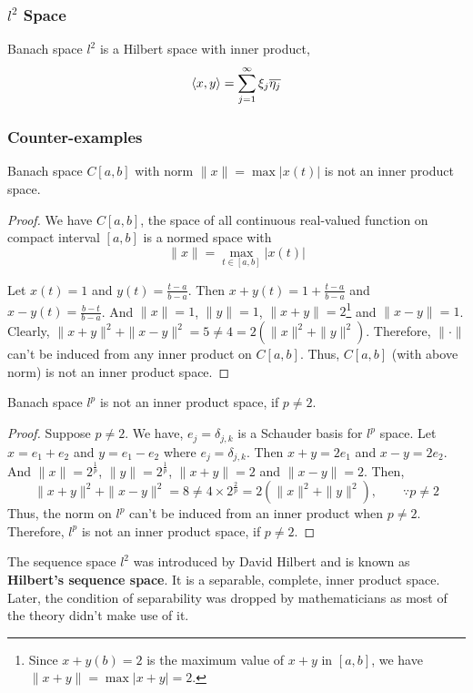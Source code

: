 \subsubsection{$l^2$ Space}
	Banach space $l^2$ is a Hilbert space with inner product,
	\[ \left\langle x,y \right\rangle = \sum_{j=1}^\infty \xi_j \overline{\eta_j} \]
\subsubsection{Counter-examples}
\begin{remark}
	Banach space $C[a,b]$ with norm $\|x\| = \max |x(t)|$ is not an inner product space.
\end{remark}
\begin{proof}
	We have $C[a,b]$, the space of all continuous real-valued function on compact interval $[a,b]$ is a normed space with \[ \|x\| = \max_{t \in [a,b]} |x(t)| \]

	Let $x(t) = 1$ and $y(t) = \frac{t-a}{b-a}$.
	Then $x+y(t) = 1+\frac{t-a}{b-a}$ and $x-y(t) = \frac{b-t}{b-a}$.
	And $\|x\| = 1$, $\|y\| =1$, $\|x+y\| = 2$\dag\footnote{Since $x+y(b) = 2$ is the maximum value of $x+y$ in $[a,b]$, we have $\|x+y\| = \max |x+y| = 2$.} and $\|x-y\| = 1$.
	Clearly, $\|x+y\|^2 + \|x-y\|^2 = 5 \ne 4 = 2(\|x\|^2+\|y\|^2)$.
	Therefore, $\| \cdot \|$ can't be induced from any inner product on $C[a,b]$.
	Thus, $C[a,b]$ (with above norm) is not an inner product space.
\end{proof}

\begin{remark}
	Banach space $l^p$ is not an inner product space, if $p \ne 2$.
\end{remark}
\begin{proof}
	Suppose $p \ne 2$.
	We have, $e_j = \delta_{j,k}$ is a Schauder basis for $l^p$ space.
	Let $x = e_1+e_2$ and $y = e_1-e_2$ where $e_j = \delta_{j,k}$.
	Then $x+y = 2e_1$ and $x-y = 2e_2$.
	And $\|x\| = 2^\frac{1}{p}$, $\|y\| = 2^\frac{1}{p}$, $\|x+y\| = 2$ and $\|x-y\| = 2$.
	Then, 
	\[ \|x+y\|^2+\|x-y\|^2 = 8 \ne 4 \times 2^\frac{2}{p} = 2(\|x\|^2+\|y\|^2), \qquad \because p \ne 2\]
	Thus, the norm on $l^p$ can't be induced from an inner product when $p \ne 2$.
	Therefore, $l^p$ is not an inner product space, if $p \ne 2$.
\end{proof}

\begin{commentary}
\begin{remark}[Hilbert]
	The sequence space $l^2$ was introduced by David Hilbert  and is known as \textbf{Hilbert's sequence space}.
	It is a separable, complete, inner product space.
	Later, the condition of separability was dropped by mathematicians as most of the theory didn't make use of it.
\end{remark}
\end{commentary}

